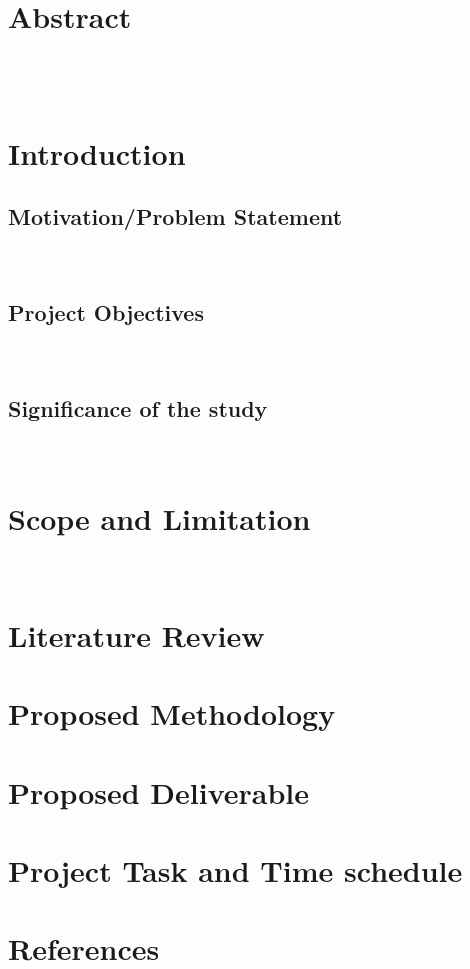 \documentclass[a4paper 14pt]{article}
\begin{document}
\newpage
{}
\setcounter{page}{1}
\section*{Abstract}
\\\\
\newpage

\newpage
\tableofcontents
\newpage
\listoffigures
\newpage
\listoftables
\newpage

\section{Introduction}

\subsection{Motivation/Problem Statement}
\\

\subsection{Project Objectives}
\\

\subsection{Significance of the study}
\\

\newpage

\section{Scope and Limitation}
\\
\break

\newpage

\section{Literature Review}

\newpage

\section{Proposed Methodology}

\newpage

\section{Proposed Deliverable}

\newpage

\section{Project Task and Time schedule}

\newpage

\newpage
\section{References}
\printbibliography[heading=none]
\end{document}
